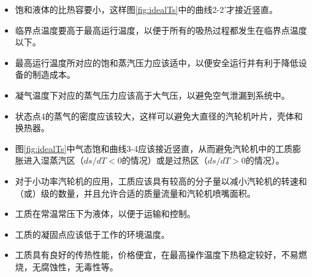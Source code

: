 \begin{itemize}
	\item 饱和液体的比热容要小，这样图\ref{fig:idealTs}中的曲线2-2'才接近竖直。
	\item 临界点温度要高于最高运行温度，以便于所有的吸热过程都发生在临界点温度以下。
	\item 最高运行温度所对应的饱和蒸汽压力应该适中，以便安全运行并有利于降低设备的制造成本。
	\item 凝气温度下对应的蒸气压力应该高于大气压，以避免空气泄漏到系统中。
	\item 状态点4的蒸气的密度应该较大，这样可以避免大直径的汽轮机叶片，壳体和换热器。
	\item 图\ref{fig:idealTs}中气态饱和曲线3-4应该接近竖直，从而避免汽轮机中的工质膨胀进入湿蒸汽区（$ds/dT < 0$的情况）或是过热区（$ds/dT > 0$的情况）。
	\item 对于小功率汽轮机的应用，工质应该具有较高的分子量以减小汽轮机的转速和（或）级的数量，并且允许合适的质量流量和汽轮机喷嘴面积。
	\item 工质在常温常压下为液体，以便于运输和控制。
	\item 工质的凝固点应该低于工作的环境温度。
	\item 工质具有良好的传热性能，价格便宜，在最高操作温度下热稳定较好，不易燃烧，无腐蚀性，无毒性等。
\end{itemize}

